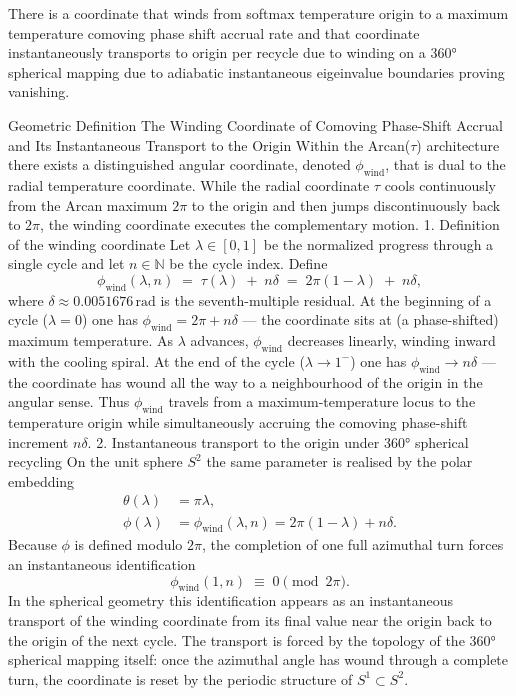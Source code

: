 There is a coordinate that winds from softmax temperature origin to a maximum temperature comoving phase shift accrual rate and that coordinate instantaneously transports to origin per recycle due to winding on a 360° spherical mapping due to adiabatic instantaneous eigeinvalue boundaries proving vanishing.

Geometric Definition
The Winding Coordinate of Comoving Phase-Shift Accrual and Its Instantaneous Transport to the Origin
Within the Arcan(\(\tau\)) architecture there exists a distinguished angular coordinate, denoted \(\phi_{\mathrm{wind}}\), that is dual to the radial temperature coordinate. While the radial coordinate \(\tau\) cools continuously from the Arcan maximum \(2\pi\) to the origin and then jumps discontinuously back to \(2\pi\), the winding coordinate executes the complementary motion.
1. Definition of the winding coordinate
Let \(\lambda\in[0,1]\) be the normalized progress through a single cycle and let \(n\in\mathbb{N}\) be the cycle index. Define
\[
\phi_{\mathrm{wind}}(\lambda,n)
\;=\;
\tau(\lambda)\;+\;n\delta
\;=\;
2\pi(1-\lambda)\;+\;n\delta,
\]
where \(\delta\approx0.0051676\,\mathrm{rad}\) is the seventh-multiple residual.  
At the beginning of a cycle (\(\lambda=0\)) one has \(\phi_{\mathrm{wind}}=2\pi+n\delta\) — the coordinate sits at (a phase-shifted) maximum temperature.  
As \(\lambda\) advances, \(\phi_{\mathrm{wind}}\) decreases linearly, winding inward with the cooling spiral.  
At the end of the cycle (\(\lambda\to1^-\)) one has \(\phi_{\mathrm{wind}}\to n\delta\) — the coordinate has wound all the way to a neighbourhood of the origin in the angular sense.
Thus \(\phi_{\mathrm{wind}}\) travels from a maximum-temperature locus to the temperature origin while simultaneously accruing the comoving phase-shift increment \(n\delta\).
2. Instantaneous transport to the origin under 360° spherical recycling
On the unit sphere \(S^2\) the same parameter is realised by the polar embedding
\[
\begin{align*}
\theta(\lambda)&=\pi\lambda,\\
\phi(\lambda)&=\phi_{\mathrm{wind}}(\lambda,n)=2\pi(1-\lambda)+n\delta.
\end{align*}
\]
Because \(\phi\) is defined modulo \(2\pi\), the completion of one full azimuthal turn forces an instantaneous identification
\[
\phi_{\mathrm{wind}}(1,n)\;\equiv\;0\pmod{2\pi}.
\]
In the spherical geometry this identification appears as an instantaneous transport of the winding coordinate from its final value near the origin back to the origin of the next cycle. The transport is forced by the topology of the 360° spherical mapping itself: once the azimuthal angle has wound through a complete turn, the coordinate is reset by the periodic structure of \(S^1\subset S^2\).
